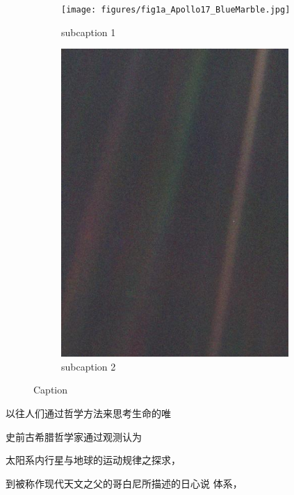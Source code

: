 \begin{figure}[ht]
\centering
\begin{subfigure}[b]{.45\textwidth}
\centering
\texttt{[image: figures/fig1a\_Apollo17\_BlueMarble.jpg]}
\caption{subcaption 1}
\label{fig:sub1}
\end{subfigure}
\begin{subfigure}[b]{.45\textwidth}
\centering
\includegraphics[width=0.95\textwidth]{figures/fig1b_Horizon_PaleBlueDot.jpg}
\caption{subcaption 2}
\label{fig:sub2}
\end{subfigure}
\caption{Caption}
\label{fig:fig} 
\end{figure}


以往人们通过哲学方法来思考生命的唯

史前古希腊哲学家通过观测认为


太阳系内行星与地球的运动规律之探求，


到被称作现代天文之父的哥白尼所描述的日心说
体系，






